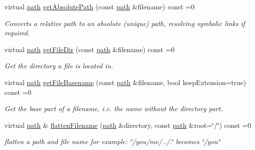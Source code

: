 \begin{DoxyCompactItemize}
virtual \hyperlink{namespaceirr_1_1io_a6468281622ce3a1c46b72e19f32dded5}{path} \hyperlink{classirr_1_1io_1_1IFileSystem_a77191d7917349a0200f5de3ef29acd18}{get\+Absolute\+Path} (const \hyperlink{namespaceirr_1_1io_a6468281622ce3a1c46b72e19f32dded5}{path} \&filename) const =0
\begin{DoxyCompactList}\small\item\em Converts a relative path to an absolute (unique) path, resolving symbolic links if required. \end{DoxyCompactList}\item 
virtual \hyperlink{namespaceirr_1_1io_a6468281622ce3a1c46b72e19f32dded5}{path} \hyperlink{classirr_1_1io_1_1IFileSystem_ad8b7b93f32f58c1ba9a8e7cacd5de80b}{get\+File\+Dir} (const \hyperlink{namespaceirr_1_1io_a6468281622ce3a1c46b72e19f32dded5}{path} \&filename) const =0
\begin{DoxyCompactList}\small\item\em Get the directory a file is located in. \end{DoxyCompactList}\item 
virtual \hyperlink{namespaceirr_1_1io_a6468281622ce3a1c46b72e19f32dded5}{path} \hyperlink{classirr_1_1io_1_1IFileSystem_a4235989e4ec21c78f1fd1ca861980c6c}{get\+File\+Basename} (const \hyperlink{namespaceirr_1_1io_a6468281622ce3a1c46b72e19f32dded5}{path} \&filename, bool keep\+Extension=true) const =0
\begin{DoxyCompactList}\small\item\em Get the base part of a filename, i.\+e. the name without the directory part. \end{DoxyCompactList}\item 
\mbox{\label{classirr_1_1io_1_1IFileSystem_aa76bbc9cc5ec7a8dbe96713f1ba20de6}} 
virtual \hyperlink{namespaceirr_1_1io_a6468281622ce3a1c46b72e19f32dded5}{path} \& \hyperlink{classirr_1_1io_1_1IFileSystem_aa76bbc9cc5ec7a8dbe96713f1ba20de6}{flatten\+Filename} (\hyperlink{namespaceirr_1_1io_a6468281622ce3a1c46b72e19f32dded5}{path} \&directory, const \hyperlink{namespaceirr_1_1io_a6468281622ce3a1c46b72e19f32dded5}{path} \&root=\char`\"{}/\char`\"{}) const =0
\begin{DoxyCompactList}\small\item\em flatten a path and file name for example\+: \char`\"{}/you/me/../.\char`\"{} becomes \char`\"{}/you\char`\"{} \end{DoxyCompactList}\item 

\end{DoxyCompactItemize}
